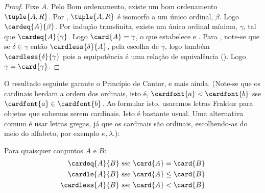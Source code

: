 \documentclass[../../../include/open-logic-section]{subfiles}
\begin{document}
\begin{proof}
Fixe $A$. Pelo Bom ordenamento, existe um bom ordenamento $\tuple{A, R}$. Por
, $\tuple{A,
R}$ é isomorfo a um único ordinal, $\beta$. Logo
$\cardeq{A}{\beta}$. Por indução transfinita, existe um único
ordinal mínimo, $\gamma$, tal que $\cardeq{A}{\gamma}$. Logo $\card{A}
= \gamma$, o que estabelece  e .
Para , note-se que se $\delta \in \gamma$ então
$\cardless{\delta}{A}$, pela escolha de $\gamma$, logo também
$\cardless{\delta}{\gamma}$ pois a equipotência é uma relação de equivalência
(). Logo $\gamma =
\card{\gamma}$.
\end{proof}

O resultado seguinte garante o Princípio de Cantor, e mais ainda.
(Note-se que os cardinais herdam a ordem dos ordinais, isto é,
$\cardfont{a} < \cardfont{b}$ sse $\cardfont{a} \in \cardfont{b}$. Ao
formular isto, usaremos letras Fraktur para objetos que sabemos serem
cardinais. Isto é bastante usual. Uma alternativa comum é usar
letras gregas, já que os cardinais são ordinais, escolhendo-as do
meio do alfabeto, por exemplo $\kappa, \lambda$.):
\begin{lem}
Para quaisquer conjuntos $A$ e $B$:
\begin{align*}
	\cardeq{A}{B} &\text{ sse } \card{A} = \card{B}\\
	\cardle{A}{B} &\text{ sse } \card{A} \leq \card{B}\\
	\cardless{A}{B}&\text{ sse } \card{A} < \card{B}
\end{align*}
\end{lem}
\end{document}
